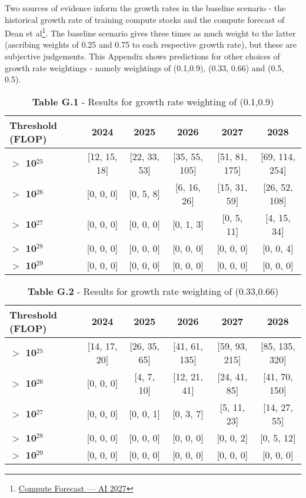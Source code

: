 \documentclass[11pt]{article}
\begin{document}
Two sources of evidence inform the growth rates in the baseline scenario - the historical growth rate of training compute stocks and the compute forecast of Dean et al\footnote{\href{https://ai-2027.com/research/compute-forecast}{Compute Forecast --- AI 2027}}. The baseline scenario gives three times as much weight to the latter (ascribing weights of 0.25 and 0.75 to each respective growth rate), but these are subjective judgements. This Appendix shows predictions for other choices of growth rate weightings - namely weightings of (0.1,0.9), (0.33, 0.66) and (0.5, 0.5).

\begin{table}[h]
\centering
\caption*{\textbf{Table G.1} - Results for growth rate weighting of (0.1,0.9)}
\begin{tabular}{|l|c|c|c|c|c|}
\hline
\textbf{Threshold (FLOP)} & \textbf{2024} & \textbf{2025} & \textbf{2026} & \textbf{2027} & \textbf{2028} \\
\hline
\textbf{$>$ 10$^{25}$} & [12, 15, 18] & [22, 33, 53] & [35, 55, 105] & [51, 81, 175] & [69, 114, 254] \\
\hline
\textbf{$>$ 10$^{26}$} & [0, 0, 0] & [0, 5, 8] & [6, 16, 26] & [15, 31, 59] & [26, 52, 108] \\
\hline
\textbf{$>$ 10$^{27}$} & [0, 0, 0] & [0, 0, 0] & [0, 1, 3] & [0, 5, 11] & [4, 15, 34] \\
\hline
\textbf{$>$ 10$^{28}$} & [0, 0, 0] & [0, 0, 0] & [0, 0, 0] & [0, 0, 0] & [0, 0, 4] \\
\hline
\textbf{$>$ 10$^{29}$} & [0, 0, 0] & [0, 0, 0] & [0, 0, 0] & [0, 0, 0] & [0, 0, 0] \\
\hline
\end{tabular}
\end{table}

\begin{table}[h]
\centering
\caption*{\textbf{Table G.2} - Results for growth rate weighting of (0.33,0.66)}
\begin{tabular}{|l|c|c|c|c|c|}
\hline
\textbf{Threshold (FLOP)} & \textbf{2024} & \textbf{2025} & \textbf{2026} & \textbf{2027} & \textbf{2028} \\
\hline
\textbf{$>$ 10$^{25}$} & [14, 17, 20] & [26, 35, 65] & [41, 61, 135] & [59, 93, 215] & [85, 135, 320] \\
\hline
\textbf{$>$ 10$^{26}$} & [0, 0, 0] & [4, 7, 10] & [12, 21, 41] & [24, 41, 85] & [41, 70, 150] \\
\hline
\textbf{$>$ 10$^{27}$} & [0, 0, 0] & [0, 0, 1] & [0, 3, 7] & [5, 11, 23] & [14, 27, 55] \\
\hline
\textbf{$>$ 10$^{28}$} & [0, 0, 0] & [0, 0, 0] & [0, 0, 0] & [0, 0, 2] & [0, 5, 12] \\
\hline
\textbf{$>$ 10$^{29}$} & [0, 0, 0] & [0, 0, 0] & [0, 0, 0] & [0, 0, 0] & [0, 0, 0] \\
\hline
\end{tabular}
\end{table}
\end{document}
